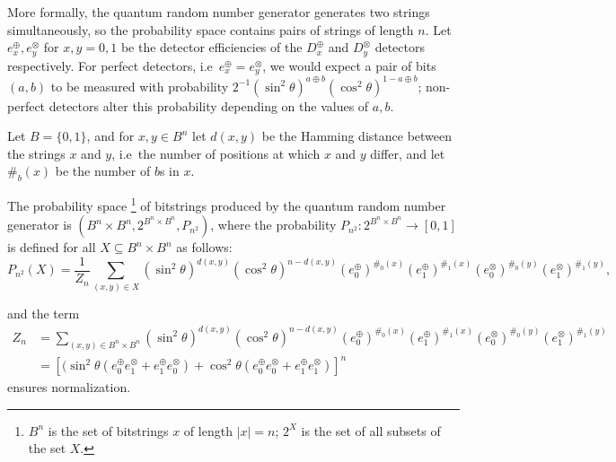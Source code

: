 \documentclass[%
 preprint,
 showpacs,
 showkeys,
 preprintnumbers,
  amsmath,amssymb,
  aps,
 pra,
  longbibliography,
  floatfix,
 ]{revtex4-1}
\newtheorem{Proposition}[Theorem]{Proposition}
\theoremstyle{definition}
\begin{document}
More formally, the quantum random number generator generates two strings simultaneously, so the probability space contains pairs of strings of length $n$. Let $e_x^\oplus,e_y^\otimes$ for $x,y=0,1$ be the detector efficiencies of the $D_x^\oplus$ and $D_y^\otimes$ detectors respectively. For perfect detectors, i.e\ $e_x^\oplus = e_y^\otimes$, we would expect a pair of bits $(a,b)$ to be measured with probability $2^{-1} (\sin^2\theta)^{a \oplus b}(\cos^2\theta)^{1-a \oplus b}$; non-perfect detectors alter this probability depending on the values of $a,b$.

Let $B=\{0,1\}$, and for $x,y \in B^n$ let $d(x,y)$ be the Hamming distance between the strings $x$ and $y$, i.e\ the number of positions at which $x$ and $y$ differ, and let $\#_b(x)$ be the number of $b$s in $x$.

	The probability space \footnote{$B^{n}$ is the set of bitstrings  $x$ of length $|x|=n$; $2^{X}$ is the set of all subsets of the set $X$.} of bitstrings produced by the quantum random number generator is $(B^n\times B^n,2^{B^n\times B^n},P_{n^2})$, where the probability $P_{n^2}: 2^{B^n\times B^n} \to [0,1]$ is defined for all $X\subseteq B^n\times B^n$ as follows:
	$$P_{n^2}(X)=\frac{1}{Z_n}\sum_{(x,y)\in X}(\sin^2\theta)^{d(x,y)}(\cos^2\theta)^{n-d(x,y)}(e_0^\oplus)^{\#_0(x)}(e_1^\oplus)^{\#_1(x)}(e_0^\otimes)^{\#_0(y)}(e_1^\otimes)^{\#_1(y)},$$
	
\noindent	and the term
	\begin{align*}
		Z_n&=\sum_{(x,y)\in B^n\times B^n}(\sin^2\theta)^{d(x,y)}(\cos^2\theta)^{n-d(x,y)}(e_0^\oplus)^{\#_0(x)}(e_1^\oplus)^{\#_1(x)}(e_0^\otimes)^{\#_0(y)}(e_1^\otimes)^{\#_1(y)}\\
		&= \left[(\sin^2\theta(e_0^\oplus e_1^\otimes + e_1^\oplus e_0^\otimes)+\cos^2\theta(e_0^\oplus e_0^\otimes + e_1^\oplus e_1^\otimes)  \right]^n
	\end{align*}
ensures normalization.
\end{document}
